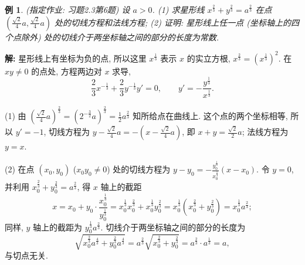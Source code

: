 \documentclass[UTF8,openany]{ctexbook}
\theoremstyle{chinesetextbook}
\newtheorem{example}{例}[section]
\newenvironment{cnsolution}{\par\indent\textbf{解:} \ignorespaces}{\par}
\begin{document}
\begin{example}\label{ex:c2-h3-6}
\textnormal{(指定作业: 习题2.3第6题)} 设 $a>0$. (1) 求星形线 $x^{\frac23}+y^{\frac23}=a^{\frac23}$ 在点 $\displaystyle\left(\frac{\sqrt2}4a,\frac{\sqrt2}4a\right)$ 处的切线方程和法线方程; (2) 证明: 星形线上任一点 (坐标轴上的四个点除外) 处的切线介于两坐标轴之间的部分的长度为常数.
\end{example}
\begin{cnsolution}
星形线上有坐标为负的点, 所以这里 $x^{\frac13}$ 表示 $x$ 的实立方根, $x^{\frac23}=\left(x^{\frac13}\right)^2$. 在 $xy\ne0$ 的点处, 方程两边对 $x$ 求导,
\[
\frac23x^{-\frac13}+\frac23y^{-\frac13}y'=0,\qquad y'=-\frac{y^{\frac13}}{x^{\frac13}}.
\]

(1) 由 $\displaystyle\left(\frac{\sqrt2}4a\right)^{\frac23}=\left(2^{-\frac32}a\right)^{\frac23}=\frac12a^{\frac23}$ 知所给点在曲线上. 这个点的两个坐标相等, 所以 $y'=-1$, 切线方程为 $\displaystyle y-\frac{\sqrt2}4a=-\left(x-\frac{\sqrt2}4a\right)$, 即 $\displaystyle x+y=\frac{\sqrt2}2a$; 法线方程为 $y=x$.

(2) 在点 $(x_0,y_0)$ ($x_0y_0\ne0$) 处的切线方程为 $\displaystyle y-y_0=-\frac{y_0^{\frac13}}{x_0^{\frac13}}(x-x_0)$. 令 $y=0$, 并利用 $x_0^{\frac23}+y_0^{\frac23}=a^{\frac23}$, 得 $x$ 轴上的截距
\[
x=x_0+y_0\cdot\frac{x_0^{\frac13}}{y_0^{\frac13}}=x_0^{\frac13}x_0^{\frac23}+x_0^{\frac13}y_0^{\frac23}=x_0^{\frac13}\left(x_0^{\frac23}+y_0^{\frac23}\right)=x_0^{\frac13}a^{\frac23};
\]
同样, $y$ 轴上的截距为 $y_0^{\frac13}a^{\frac23}$. 切线介于两坐标轴之间的部分的长度为
\[
\sqrt{x_0^{\frac23}a^{\frac43}+y_0^{\frac23}a^{\frac43}}=a^{\frac23}\sqrt{x_0^{\frac23}+y_0^{\frac23}}=a^{\frac23}\cdot a^{\frac13}=a,
\]
与切点无关.
\end{cnsolution}
\end{document}
